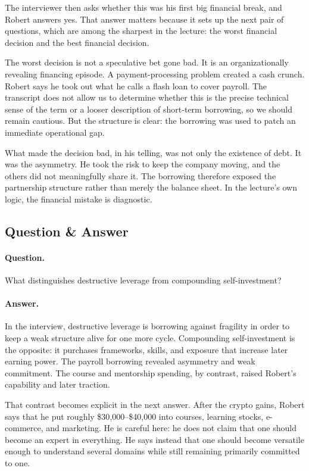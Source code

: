 The interviewer then asks whether this was his first big financial break, and Robert answers yes. That answer matters because it sets up the next pair of questions, which are among the sharpest in the lecture: the worst financial decision and the best financial decision.

The worst decision is not a speculative bet gone bad. It is an organizationally revealing financing episode. A payment-processing problem created a cash crunch. Robert says he took out what he calls a flash loan to cover payroll. The transcript does not allow us to determine whether this is the precise technical sense of the term or a looser description of short-term borrowing, so we should remain cautious. But the structure is clear: the borrowing was used to patch an immediate operational gap.

What made the decision bad, in his telling, was not only the existence of debt. It was the asymmetry. He took the risk to keep the company moving, and the others did not meaningfully share it. The borrowing therefore exposed the partnership structure rather than merely the balance sheet. In the lecture's own logic, the financial mistake is diagnostic.

\subsection{Question \& Answer}

\paragraph{Question.}
What distinguishes destructive leverage from compounding self-investment?

\paragraph{Answer.}
In the interview, destructive leverage is borrowing against fragility in order to keep a weak structure alive for one more cycle. Compounding self-investment is the opposite: it purchases frameworks, skills, and exposure that increase later earning power. The payroll borrowing revealed asymmetry and weak commitment. The course and mentorship spending, by contrast, raised Robert's capability and later traction.

That contrast becomes explicit in the next answer. After the crypto gains, Robert says that he put roughly \$30{,}000--\$40{,}000 into courses, learning stocks, e-commerce, and marketing. He is careful here: he does not claim that one should become an expert in everything. He says instead that one should become versatile enough to understand several domains while still remaining primarily committed to one.

